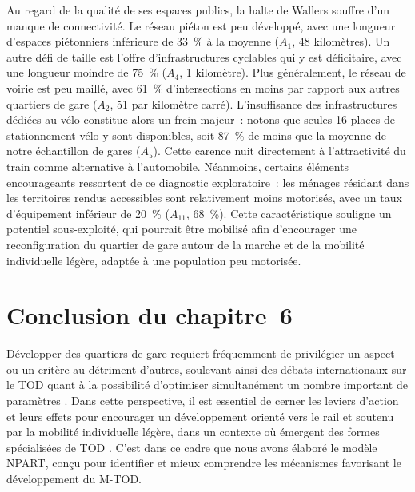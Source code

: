 \begin{refsegment}
Au regard de la qualité de ses espaces publics, la halte de Wallers souffre d'un manque de connectivité. Le réseau piéton est peu développé, avec une longueur d'espaces piétonniers inférieure de 33~\% à la moyenne (\(A_{1}\), 48 kilomètres). Un autre défi de taille est l'offre d'infrastructures cyclables qui y est déficitaire, avec une longueur moindre de 75~\% (\(A_{4}\), 1 kilomètre). Plus généralement, le réseau de voirie est peu maillé, avec 61~\% d'intersections en moins par rapport aux autres quartiers de gare (\(A_{2}\), 51 par kilomètre carré). L'insuffisance des infrastructures dédiées au vélo constitue alors un frein majeur~: notons que seules 16 places de stationnement vélo y sont disponibles, soit 87~\% de moins que la moyenne de notre échantillon de gares (\(A_{5}\)). Cette carence nuit directement à l'attractivité du train comme alternative à l'automobile. Néanmoins, certains éléments encourageants ressortent de ce diagnostic exploratoire~: les ménages résidant dans les territoires rendus accessibles sont relativement moins motorisés, avec un taux d'équipement inférieur de 20~\% (\(A_{11}\), 68~\%). Cette caractéristique souligne un potentiel sous-exploité, qui pourrait être mobilisé afin d'encourager une reconfiguration du quartier de gare autour de la marche et de la mobilité individuelle légère, adaptée à une population peu motorisée.%

    \newpage
\section*{Conclusion du chapitre~6
    \label{chap6:conclusion}
    }

Développer des quartiers de gare requiert fréquemment de privilégier un aspect ou un critère au détriment d’autres, soulevant ainsi des débats internationaux sur le \acrshort{TOD} quant à la possibilité d’optimiser simultanément un nombre important de paramètres \textcolor{blue}{\autocite[181]{veloso_e_zarate_quartiers_2024}}. Dans cette perspective, il est essentiel de cerner les leviers d’action et leurs effets pour encourager un développement orienté vers le rail et soutenu par la mobilité individuelle légère, dans un contexte où émergent des formes spécialisées de \acrshort{TOD} \textcolor{blue}{\autocite[111]{cervero_transit-oriented_2017}}. C’est dans ce cadre que nous avons élaboré le modèle \acrshort{NPART}, conçu pour identifier et mieux comprendre les mécanismes favorisant le développement du \acrshort{M-TOD}.%


\end{refsegment}
